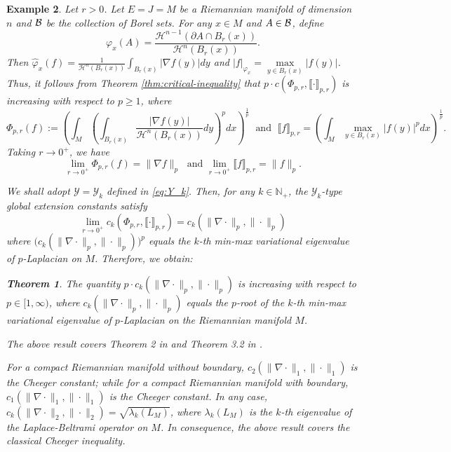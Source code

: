 \documentclass[12pt,a4paper]{article}
\newtheorem{theorem}{Theorem}[section]
\newtheorem{example}[theorem]{Example}
\begin{document}
\begin{example}%
Let $r> 0$. Let $E=J=M$ be a Riemannian manifold of dimension $n$ and $\mathcal{B}$ be the collection of Borel sets. For any $x\in M$ and $A\in\mathcal{B}$, define $$\varphi_x(A)=\frac{\mathcal{H}^{n-1}(\partial A\cap B_r(x))}{\mathcal{H}^n(B_r(x))}.$$ 
Then 
$\widehat{\varphi}_x(f)=\frac{1}{\mathcal{H}^n(B_r(x))}\int_{B_r(x)}|\nabla f(y)|dy$ and $|f|_{\varphi_x}=\max\limits_{y\in B_r(x)}|f(y)|$. Thus, it follows from Theorem \ref{thm:critical-inequality} that 
$p\cdot c(\Phi_{p,r},\llbracket \cdot\rrbracket_{p,r})$ is increasing with respect to $p\ge1$, where $$\Phi_{p,r}(f):=\left( \int_M\left(\int_{B_r(x)}\frac{|\nabla f(y)|}{\mathcal{H}^n(B_r(x))}dy\right)^pdx
\right)^{\frac1p}\;\text{ and }\; \llbracket f\rrbracket_{p,r}=\left( \int_M\max\limits_{y\in B_r(x)}|f(y)|^pdx
\right)^{\frac1p}.$$
Taking $r\to0^+$, we have
$$\lim\limits_{r\to0^+}\Phi_{p,r}(f)=\|\nabla f\|_p\;\text{ and }\lim\limits_{r\to0^+}\llbracket f\rrbracket_{p,r}=\|  f\|_p.
$$

We shall adopt $\mathcal{Y}=\mathcal{Y}_k$ defined in \eqref{eq:Y_k}. 
Then, for any $k\in \mathbb{N}_+$, the $\mathcal{Y}_k$-type global extension constants %
satisfy
$$
\lim\limits_{r\to0^+}c_k(\Phi_{p,r},\llbracket \cdot\rrbracket_{p,r})=c_k( \|\nabla \cdot\|_p,\| \cdot\|_p)$$
where $\big(c_k( \|\nabla \cdot\|_p,\| \cdot\|_p)\big)^p$ equals the $k$-th min-max variational eigenvalue of $p$-Laplacian on $M$.
Therefore, we obtain:
\begin{theorem}
The quantity $p\cdot c_k( \|\nabla \cdot\|_p,\| \cdot\|_p)$ is increasing with respect to  $p\in[1,\infty)$, where $c_k( \|\nabla \cdot\|_p,\| \cdot\|_p)$ equals the $p$-root of  the $k$-th min-max variational eigenvalue of $p$-Laplacian on the Riemannian manifold $M$.  
\end{theorem}
The above result covers Theorem 2 in \cite{Jose21} and Theorem 3.2 in \cite{Lindqvist93}. %

For a compact Riemannian manifold without boundary, $c_2( \|\nabla \cdot\|_1,\| \cdot\|_1)$ is the Cheeger constant; while for a compact Riemannian manifold with boundary, $c_1( \|\nabla \cdot\|_1,\| \cdot\|_1)$ is the Cheeger constant. In any case, $c_k( \|\nabla \cdot\|_2,\| \cdot\|_2)=\sqrt{\lambda_k(L_M)}$, where $\lambda_k(L_M)$ is the $k$-th eigenvalue of the Laplace-Beltrami operator on $M$. 
In consequence, the above result covers the classical Cheeger inequality.
\end{example}
\end{document}
